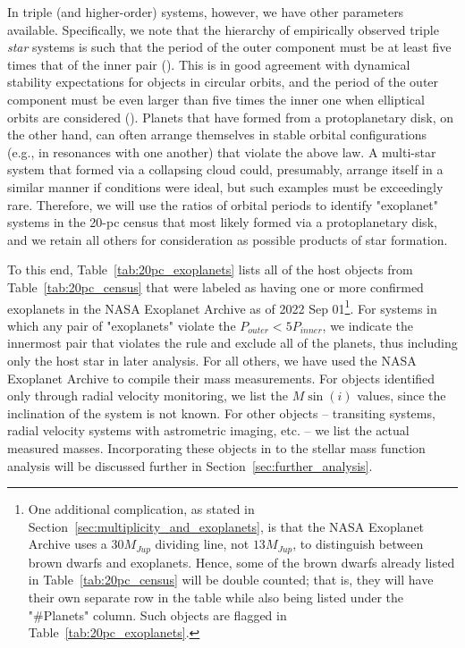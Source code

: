 \documentclass[twocolumn,tighten,twocolappendix]{aastex631}
\begin{document}
In triple (and higher-order) systems, however, we have other parameters available. Specifically, we note that the hierarchy of empirically observed triple {\it star} systems is such that the period of the outer component must be at least five times that of the inner pair (\citealt{tokovinin2004}). This is in good agreement with dynamical stability expectations for objects in circular orbits, and the period of the outer component must be even larger than five times the inner one when elliptical orbits are considered (\citealt{mardling2001}). Planets that have formed from a protoplanetary disk, on the other hand, can often arrange themselves in stable orbital configurations (e.g., in resonances with one another) that violate the above law. A multi-star system that formed via a collapsing cloud could, presumably, arrange itself in a similar manner if conditions were ideal, but such examples must be exceedingly rare. Therefore, we will use the ratios of orbital periods to identify "exoplanet" systems in the 20-pc census that most likely formed via a protoplanetary disk, and we retain all others for consideration as possible products of star formation.

To this end, Table~\ref{tab:20pc_exoplanets} lists all of the host objects from Table~\ref{tab:20pc_census} that were labeled as having one or more confirmed exoplanets in the NASA Exoplanet Archive as of 2022 Sep 01\footnote{One additional complication, as stated in Section~\ref{sec:multiplicity_and_exoplanets}, is that the NASA Exoplanet Archive uses a $30M_{Jup}$ dividing line, not $13M_{Jup}$, to distinguish between brown dwarfs and exoplanets. Hence, some of the brown dwarfs already listed in Table~\ref{tab:20pc_census} will be double counted; that is, they will have their own separate row in the table while also being listed under the "\#Planets" column. Such objects are flagged in Table~\ref{tab:20pc_exoplanets}.}. For systems in which any pair of "exoplanets" violate the $P_{outer} < 5P_{inner}$, we indicate the innermost pair that violates the rule and exclude all of the planets, thus including only the host star in later analysis. For all others, we have used the NASA Exoplanet Archive to compile their mass measurements. For objects identified only through radial velocity monitoring, we list the $M \sin(i)$ values, since the inclination of the system is not known. For other objects -- transiting systems, radial velocity systems with astrometric imaging, etc. -- we list the actual measured masses. Incorporating these objects in to the stellar mass function analysis will be discussed further in Section~\ref{sec:further_analysis}.
\end{document}
